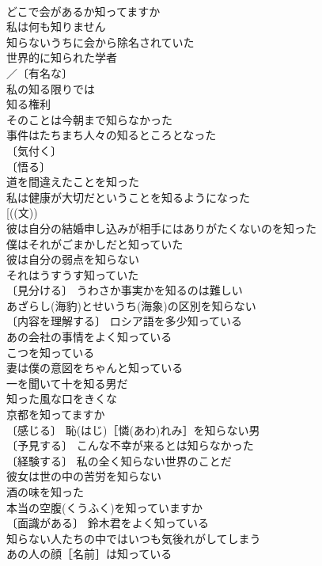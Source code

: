 \documentclass[8pt]{extreport}
\begin{document}
\begin{CJK}{UTF8}{min}
\\	どこで会があるか知ってますか 
\\	私は何も知りません 
\\	知らないうちに会から除名されていた 
\\	世界的に知られた学者 
\\	／〔有名な〕
\\	私の知る限りでは 
\\	知る権利 
\\	そのことは今朝まで知らなかった 
\\	事件はたちまち人々の知るところとなった 
\\	〔気付く〕
\\	〔悟る〕
\\	道を間違えたことを知った 
\\	私は健康が大切だということを知るようになった 
\\	[((文))
\\	彼は自分の結婚申し込みが相手にはありがたくないのを知った 
\\	僕はそれがごまかしだと知っていた 
\\	彼は自分の弱点を知らない 
\\	それはうすうす知っていた 
\\	〔見分ける〕 うわさか事実かを知るのは難しい 
\\	あざらし(海豹)とせいうち(海象)の区別を知らない 
\\	〔内容を理解する〕 ロシア語を多少知っている 
\\	あの会社の事情をよく知っている 
\\	こつを知っている 
\\	妻は僕の意図をちゃんと知っている 
\\	一を聞いて十を知る男だ 
\\	知った風な口をきくな 
\\	京都を知ってますか 
\\	〔感じる〕 恥(はじ)［憐(あわ)れみ］を知らない男 
\\	〔予見する〕 こんな不幸が来るとは知らなかった 
\\	〔経験する〕 私の全く知らない世界のことだ 
\\	彼女は世の中の苦労を知らない 
\\	酒の味を知った 
\\	本当の空腹(くうふく)を知っていますか 
\\	〔面識がある〕 鈴木君をよく知っている 
\\	知らない人たちの中ではいつも気後れがしてしまう 
\\	あの人の顔［名前］は知っている 

\end{CJK}
\end{document}
